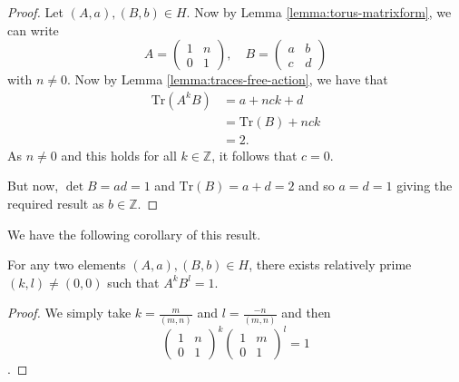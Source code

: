 \begin{proof}
    Let $(A, a),(B,b) \in H$. Now by Lemma \ref{lemma:torus-matrixform}, we can write
    $$A = \begin{pmatrix}
            1 & n \\
            0 & 1
        \end{pmatrix}, \quad B = \begin{pmatrix}
            a & b \\
            c & d
        \end{pmatrix}$$
    with $n \neq 0$. Now by Lemma \ref{lemma:traces-free-action}, we have that
    \begin{align*}
        \text{Tr}(A^kB) & = a + nck + d        \\
                        & = \text{Tr}(B) + nck \\
                        & = 2.
    \end{align*}
    As $n\neq 0$ and this holds for all $k \in \mathbb{Z}$, it follows that $c=0$.

    But now, $\det B = ad = 1$ and $\text{Tr}(B) = a+d = 2$ and so $a=d=1$ giving
    the required result as $b \in \mathbb{Z}$.
\end{proof}

We have the following corollary of this result.
\begin{corollary}
    \label{corr:rel-prime}
    For any two elements $(A,a), (B,b) \in H$, there exists relatively prime $(k,l) \neq (0,0)$ such that $A^kB^l = 1$.
\end{corollary}
\begin{proof}
    We simply take $k = \frac{m}{(m,n)}$ and $l = \frac{-n}{(m,n)}$ and then
    $$\begin{pmatrix}
            1 & n \\
            0 & 1
        \end{pmatrix}^k\begin{pmatrix}
            1 & m \\
            0 & 1
        \end{pmatrix}^l = 1$$.
\end{proof}

